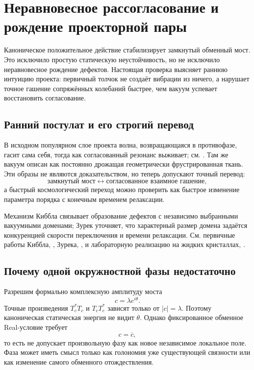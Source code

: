 \chapter{Неравновесное рассогласование и рождение проекторной пары}

Каноническое положительное действие стабилизирует замкнутый обменный мост.
Это исключило простую статическую неустойчивость, но не исключило
неравновесное рождение дефектов. Настоящая проверка выясняет раннюю интуицию
проекта: первичный толчок не создаёт вибрации из ничего, а нарушает точное
гашение сопряжённых колебаний быстрее, чем вакуум успевает восстановить
согласование.

\section{Ранний постулат и его строгий перевод}

В исходном популярном слое проекта волна, возвращающаяся в противофазе,
гасит сама себя, тогда как согласованный резонанс выживает; см.
. Там же вакуум описан
как постоянно дрожащая геометрически фрустрированная ткань. Эти образы не
являются доказательством, но теперь допускают точный перевод:
\begin{equation}
 \text{замкнутый мост}
 \longleftrightarrow
 \text{согласованное взаимное гашение},
\end{equation}
а быстрый космологический переход можно проверить как быстрое изменение параметра
порядка с конечным временем релаксации.

Механизм Киббла связывает образование дефектов с независимо выбранными
вакуумными доменами; Зурек уточняет, что характерный размер домена задаётся
конкуренцией скорости переключения и времени релаксации. См. первичные работы
Киббла, , Зурека,
, и лабораторную реализацию на жидких
кристаллах, .

\section{Почему одной окружностной фазы недостаточно}

Разрешим формально комплексную амплитуду моста
\begin{equation}
 c=\lambda e^{i\theta}.
\end{equation}
Точные произведения $T_c^*T_c$ и $T_cT_c^*$ зависят только от
$|c|=\lambda$. Поэтому каноническая статическая энергия не видит
$\theta$. Однако фиксированное обменное Real-условие требует
\begin{equation}
 c=\overline c,
\end{equation}
то есть не допускает произвольную фазу как новое независимое локальное
поле. Фаза может иметь смысл только как голономия уже существующей
связности или как изменение самого обменного отождествления.

